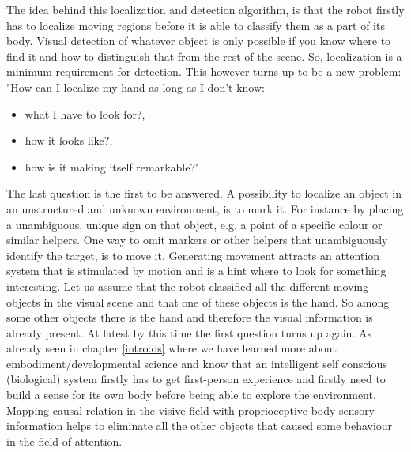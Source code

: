 \documentclass[conference]{IEEEtran}
\begin{document}
The idea behind this localization and detection algorithm, is that the robot firstly has to localize moving regions before it is able to classify them as a part of its body. %
Visual detection of whatever object is only possible if you know where to find it and how to distinguish that from the rest of the scene. So, localization is a minimum requirement for detection. This however turns up to be a new problem: "How can I localize my hand as long as I don't know:
\begin{itemize}
	\item what I have to look for?,
	\item how it looks like?,
	\item how is it making itself remarkable?"
\end{itemize}
The last question is the first to be answered. A possibility to localize an object in an unstructured and unknown environment, is to mark it. For instance by placing a unambiguous, unique sign on that object, e.g. a point of a specific colour or similar helpers. %
One way to omit markers or other helpers that unambiguously identify the target, is to move it. Generating movement attracts an attention system that is stimulated by motion and is a hint where to look for something interesting. Let us assume that the robot classified all the different moving objects in the visual scene and that one of these objects is the hand. So among some other objects there is the hand and therefore the visual information is already present. At latest by this time the first question turns up again. As already seen in chapter \ref{intro:ds} where we have learned more about embodiment/developmental science and know that an intelligent self conscious (biological) system firstly has to get first-person experience \cite{ADAP03} and firstly need to build a sense for its own body \cite{DERBS04-02} before being able to explore the environment. Mapping causal relation in the visive field with proprioceptive body-sensory information helps to eliminate all the other objects that caused some behaviour in the field of attention.
\end{document}
